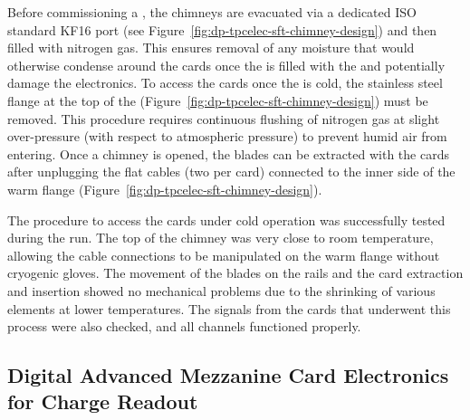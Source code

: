 Before commissioning a , the chimneys are evacuated via a dedicated ISO standard KF16 port (see Figure~\ref{fig:dp-tpcelec-sft-chimney-design}) and then filled with nitrogen gas. This ensures removal of any moisture that would otherwise condense around the  cards once the  is filled with the \lar and %
potentially damage the electronics. To access the  cards once the  is cold, the stainless steel flange at the top of the  (Figure~\ref{fig:dp-tpcelec-sft-chimney-design}) must be removed. This procedure requires continuous flushing of nitrogen gas at slight over-pressure (with respect to atmospheric pressure) to prevent humid air from  entering. Once a chimney is opened, the blades can be extracted with the  cards after unplugging the flat cables (two per card) connected to the inner side of the warm flange (Figure~\ref{fig:dp-tpcelec-sft-chimney-design}).

The procedure to access the  cards under cold operation was successfully tested  %
during the   run. The top of the chimney was very close to room temperature, allowing the cable connections to be manipulated on the warm \fdth flange without cryogenic gloves. The movement of the blades on the rails and the  card extraction and insertion %
showed no mechanical problems due to the shrinking of various elements at lower temperatures.  The signals from the  cards that underwent this process were also checked, and all channels functioned properly.


\subsection{Digital Advanced Mezzanine Card Electronics for Charge Readout}
\label{ssec:dp-tpcelec-design-amc}

